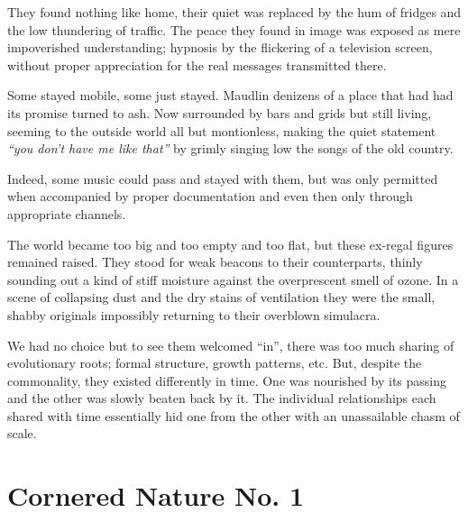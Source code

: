 \documentclass{book}
\begin{document}
They found nothing like home, their quiet was replaced by the hum of fridges
and the low thundering of traffic. The peace they found in image was exposed as
mere impoverished understanding; hypnosis by the flickering of a television
screen, without proper appreciation for the real messages transmitted there.

Some stayed mobile, some just stayed. Maudlin denizens of a place that had had
its promise turned to ash. Now surrounded by bars and grids but still living,
seeming to the outside world all but montionless, making the quiet statement
\emph{``you don't have me like that''} by grimly singing low the songs of the
old country.

Indeed, some music could pass and stayed with them, but was only permitted when
accompanied by proper documentation and even then only through appropriate
channels.

The world became too big and too empty and too flat, but these ex-regal figures
remained raised. They stood for weak beacons to their counterparts, thinly
sounding out a kind of stiff moisture against the overprescent smell of ozone.
In a scene of collapsing dust and the dry stains of ventilation they were the
small, shabby originals impossibly returning to their overblown simulacra.

We had no choice but to see them welcomed ``in'', there was too much sharing of
evolutionary roots; formal structure, growth patterns, etc. But, despite the
commonality, they existed differently in time. One was nourished by its passing
and the other was slowly beaten back by it. The individual relationships each
shared with time essentially hid one from the other with an unassailable chasm
of scale.

\chapter{Cornered Nature No. 1}
\end{document}
